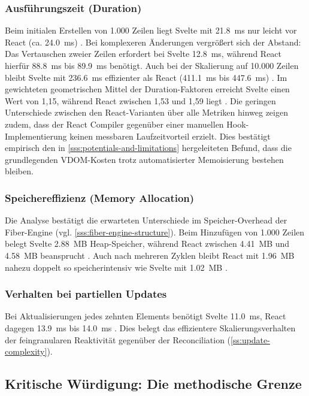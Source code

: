 \subsubsection{Ausführungszeit (Duration)}
Beim initialen Erstellen von 1.000 Zeilen liegt Svelte mit \qty{21,8}{ms} nur leicht vor React (ca. \qty{24,0}{ms}) \cite{krause-benchmark-2026}. Bei komplexeren Änderungen vergrößert sich der Abstand: Das Vertauschen zweier Zeilen erfordert bei Svelte \qty{12,8}{ms}, während React hierfür \qty{88,8}{ms} bis \qty{89,9}{ms} benötigt. Auch bei der Skalierung auf 10.000 Zeilen bleibt Svelte mit \qty{236,6}{ms} effizienter als React (\qty{411,1}{ms} bis \qty{447,6}{ms}) \cite{krause-benchmark-2026}. Im gewichteten geometrischen Mittel der Duration-Faktoren erreicht Svelte einen Wert von 1,15, während React zwischen 1,53 und 1,59 liegt \cite{krause-benchmark-2026}. Die geringen Unterschiede zwischen den React-Varianten über alle Metriken hinweg zeigen zudem, dass der React Compiler gegenüber einer manuellen Hook-Implementierung keinen messbaren Laufzeitvorteil erzielt. Dies bestätigt empirisch den in \cref{sss:potentials-and-limitations} hergeleiteten Befund, dass die grundlegenden VDOM-Kosten trotz automatisierter Memoisierung bestehen bleiben.

\subsubsection{Speichereffizienz (Memory Allocation)}
Die Analyse bestätigt die erwarteten Unterschiede im Speicher-Overhead der Fiber-Engine (vgl. \cref{sss:fiber-engine-structure}). Beim Hinzufügen von 1.000 Zeilen belegt Svelte \qty{2,88}{MB} Heap-Speicher, während React zwischen \qty{4,41}{MB} und \qty{4,58}{MB} beansprucht \cite{krause-benchmark-2026}. Auch nach mehreren Zyklen bleibt React mit \qty{1,96}{MB} nahezu doppelt so speicherintensiv wie Svelte mit \qty{1,02}{MB} \cite{krause-benchmark-2026}.

\subsubsection{Verhalten bei partiellen Updates}
Bei Aktualisierungen jedes zehnten Elements benötigt Svelte \qty{11,0}{ms}, React dagegen \qty{13,9}{ms} bis \qty{14,0}{ms} \cite{krause-benchmark-2026}. Dies belegt das effizientere Skalierungsverhalten der feingranularen Reaktivität gegenüber der Reconciliation (\cref{ss:update-complexity}).

\subsection{Kritische Würdigung: Die methodische Grenze}
\label{ss:benchmark-limitations}

